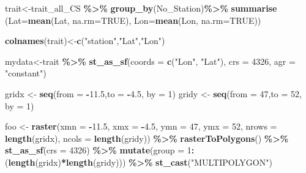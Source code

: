 \documentclass[
]{article}
\newenvironment{Shaded}{\begin{snugshade}}{\end{snugshade}}
\newcommand{\AttributeTok}[1]{\textcolor[rgb]{0.13,0.29,0.53}{#1}}
\newcommand{\ConstantTok}[1]{\textcolor[rgb]{0.56,0.35,0.01}{#1}}
\newcommand{\DecValTok}[1]{\textcolor[rgb]{0.00,0.00,0.81}{#1}}
\newcommand{\FloatTok}[1]{\textcolor[rgb]{0.00,0.00,0.81}{#1}}
\newcommand{\FunctionTok}[1]{\textcolor[rgb]{0.13,0.29,0.53}{\textbf{#1}}}
\newcommand{\NormalTok}[1]{#1}
\newcommand{\OtherTok}[1]{\textcolor[rgb]{0.56,0.35,0.01}{#1}}
\newcommand{\SpecialCharTok}[1]{\textcolor[rgb]{0.81,0.36,0.00}{\textbf{#1}}}
\newcommand{\StringTok}[1]{\textcolor[rgb]{0.31,0.60,0.02}{#1}}
\begin{document}
\begin{Shaded}
\begin{Highlighting}[]
\NormalTok{trait}\OtherTok{\textless{}{-}}\NormalTok{trait\_all\_CS }\SpecialCharTok{\%\textgreater{}\%} 
  \FunctionTok{group\_by}\NormalTok{(No\_Station)}\SpecialCharTok{\%\textgreater{}\%} 
  \FunctionTok{summarise}\NormalTok{ (}\AttributeTok{Lat=}\FunctionTok{mean}\NormalTok{(Lat, }\AttributeTok{na.rm=}\ConstantTok{TRUE}\NormalTok{), }\AttributeTok{Lon=}\FunctionTok{mean}\NormalTok{(Lon, }\AttributeTok{na.rm=}\ConstantTok{TRUE}\NormalTok{))}

\FunctionTok{colnames}\NormalTok{(trait)}\OtherTok{\textless{}{-}}\FunctionTok{c}\NormalTok{(}\StringTok{"station"}\NormalTok{,}\StringTok{"Lat"}\NormalTok{,}\StringTok{"Lon"}\NormalTok{)}

\NormalTok{mydata}\OtherTok{\textless{}{-}}\NormalTok{trait }\SpecialCharTok{\%\textgreater{}\%}  \FunctionTok{st\_as\_sf}\NormalTok{(}\AttributeTok{coords =} \FunctionTok{c}\NormalTok{(}\StringTok{"Lon"}\NormalTok{, }\StringTok{"Lat"}\NormalTok{), }
                            \AttributeTok{crs =} \DecValTok{4326}\NormalTok{, }\AttributeTok{agr =} \StringTok{"constant"}\NormalTok{)}


\NormalTok{gridx }\OtherTok{\textless{}{-}} \FunctionTok{seq}\NormalTok{(}\AttributeTok{from =} \SpecialCharTok{{-}}\FloatTok{11.5}\NormalTok{,}\AttributeTok{to =} \SpecialCharTok{{-}}\FloatTok{4.5}\NormalTok{, }\AttributeTok{by =} \DecValTok{1}\NormalTok{)}
\NormalTok{gridy }\OtherTok{\textless{}{-}} \FunctionTok{seq}\NormalTok{(}\AttributeTok{from =} \DecValTok{47}\NormalTok{,}\AttributeTok{to =} \DecValTok{52}\NormalTok{, }\AttributeTok{by =} \DecValTok{1}\NormalTok{)}


\NormalTok{foo }\OtherTok{\textless{}{-}} \FunctionTok{raster}\NormalTok{(}\AttributeTok{xmn =} \SpecialCharTok{{-}}\FloatTok{11.5}\NormalTok{, }\AttributeTok{xmx =} \SpecialCharTok{{-}}\FloatTok{4.5}\NormalTok{,}
              \AttributeTok{ymn =} \DecValTok{47}\NormalTok{, }\AttributeTok{ymx =} \DecValTok{52}\NormalTok{,}
              \AttributeTok{nrows =} \FunctionTok{length}\NormalTok{(gridx),}
              \AttributeTok{ncols =} \FunctionTok{length}\NormalTok{(gridy)) }\SpecialCharTok{\%\textgreater{}\%} 
  \FunctionTok{rasterToPolygons}\NormalTok{() }\SpecialCharTok{\%\textgreater{}\%} 
  \FunctionTok{st\_as\_sf}\NormalTok{(}\AttributeTok{crs =} \DecValTok{4326}\NormalTok{) }\SpecialCharTok{\%\textgreater{}\%} 
  \FunctionTok{mutate}\NormalTok{(}\AttributeTok{group =} \DecValTok{1}\SpecialCharTok{:}\NormalTok{(}\FunctionTok{length}\NormalTok{(gridx)}\SpecialCharTok{*}\FunctionTok{length}\NormalTok{(gridy))) }\SpecialCharTok{\%\textgreater{}\%} 
  \FunctionTok{st\_cast}\NormalTok{(}\StringTok{"MULTIPOLYGON"}\NormalTok{)}



\end{Highlighting}
\end{Shaded}
\end{document}
